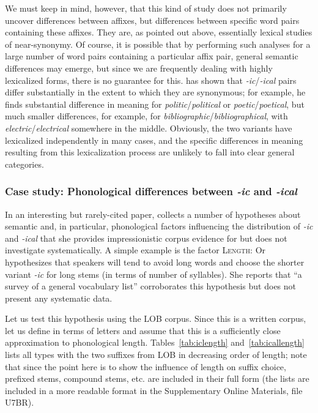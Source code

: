 We must keep in mind, however, that this kind of study does not primarily uncover differences between affixes,  but differences between specific word pairs containing these affixes.  They are, as pointed out above, essentially lexical studies of near\hyp{}synonymy.  Of course, it is possible that by performing such analyses for a large number of word pairs containing a particular affix  pair, general semantic  differences may emerge, but since we are frequently dealing with highly lexicalized  forms, there is no guarantee for this. \citet{gries_corpus-linguistic_2001, gries_testing_2003} has shown that \textit{-ic}\slash \textit{-ical} pairs differ substantially in the extent to which they are synonymous;  for example, he finds substantial difference in meaning for \textit{politic}\slash \textit{political} or \textit{poetic}\slash \textit{poetical}, but much smaller differences, for example, for \textit{bibliographic}\slash \textit{bibliographical}, with \textit{electric}\slash \textit{electrical} somewhere in the middle. Obviously, the two variants have lexicalized  independently in many cases, and the specific differences in meaning  resulting from this lexicalization process are unlikely to fall into clear general categories.
\pagebreak
\subsubsection{Case study: Phonological differences between \textit{-ic} and \textit{-ical}}\label{sec:phonologicaldifferencesbetweenicandical}\largerpage

In an interesting but rarely\hyp{}cited paper, \citet{or_corpus-based_1994} collects a number of hypotheses about semantic  and, in particular, phonological factors influencing the distribution  of \textit{-ic} and \textit{-ical} that she provides impressionistic corpus evidence for but does not investigate systematically. A simple example is the factor \textsc{Length}:  Or hypothesizes that speakers will tend to avoid long words and choose the shorter variant \textit{-ic} for long stems  (in terms of number of syllables).  She reports that ``a survey of a general vocabulary list'' corroborates this hypothesis but does not present any systematic data.

Let us test this hypothesis using the LOB  corpus. Since this is a written  corpus, let us define   in terms of letters and assume that this is a sufficiently close approximation to phonological length. Tables~\ref{tab:iclength} and~\ref{tab:icallength} lists all types  with the two suffixes  from LOB  in decreasing order of length; note that since the point here is to show the influence of length on suffix choice, prefixed stems,  compound stems, etc. are included in their full form (the lists are included in a more readable format in the Supplementary Online Materials, file U7BR).

